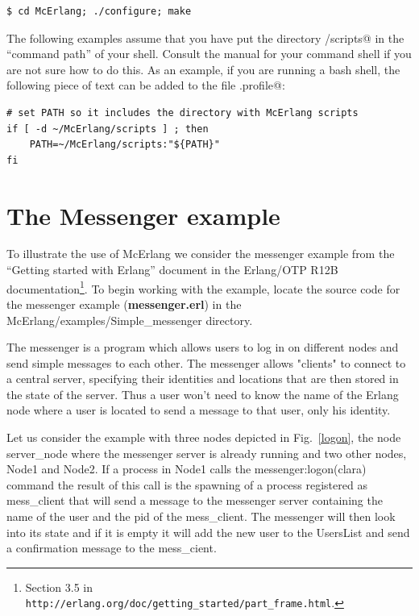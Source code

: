 \documentclass[a4paper]{article}
\newcommand{\simplemessengerdir}{McErlang/examples/Simple\_messenger\xspace}
\begin{document}
\begin{verbatim}
$ cd McErlang; ./configure; make
\end{verbatim}

The following examples assume that you have 
put the directory \verb@McErlang/scripts@
in the ``command path'' of your shell.
Consult the manual for your command shell if you are not sure how to do this.
As an example, 
if you are running a bash shell, the following piece of text
can be added to the file \verb@.profile@:
\begin{verbatim}
# set PATH so it includes the directory with McErlang scripts
if [ -d ~/McErlang/scripts ] ; then
    PATH=~/McErlang/scripts:"${PATH}"
fi
\end{verbatim}

\section{The Messenger example}

To illustrate the use of McErlang we consider the messenger example
from the ``Getting started with Erlang'' document in the Erlang/OTP
R12B documentation\footnote{Section 3.5 in
  \texttt{http://erlang.org/doc/getting\_started/part\_frame.html}.}.
To begin working with the example, locate the source code for the
messenger example ({\bf messenger.erl}) in the \simplemessengerdir
directory.

The messenger is a program which allows users to log in on different
nodes and send simple messages to each other. The messenger allows
"clients" to connect to a central server, specifying their identities
and locations that are then stored in the state of the server. Thus a
user won't need to know the name of the Erlang node where a user is
located to send a message to that user, only his identity.

Let us consider the example with three nodes depicted in
Fig.\ \ref{logon}, the node server\_node where the messenger server is
already running and two other nodes, Node1 and Node2. If a process in
Node1 calls the messenger:logon(clara) command the result of this call
is the spawning of a process registered as mess\_client that will send
a message to the messenger server containing the name of the user and
the pid of the mess\_client. The messenger will then look into its
state and if it is empty it will add the new user to the UsersList and
send a confirmation message to the mess\_cient.
 
\end{document}
